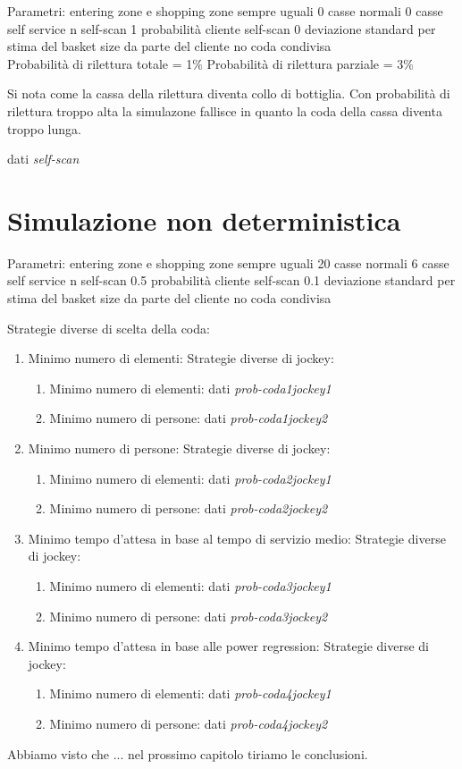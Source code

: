 Parametri:
entering zone e shopping zone sempre uguali
0 casse normali
0 casse self service
n self-scan
1 probabilità cliente self-scan
0 deviazione standard per stima del basket size da parte del cliente
no coda condivisa
\\
Probabilità di rilettura totale = 1\%
Probabilità di rilettura parziale = 3\%

Si nota come la cassa della rilettura diventa collo di bottiglia. Con probabilità di rilettura troppo alta la simulazone fallisce in quanto la coda della cassa diventa troppo lunga.

dati \textit{self-scan}

\section{Simulazione non deterministica}

Parametri:
entering zone e shopping zone sempre uguali
20 casse normali
6 casse self service
n self-scan
0.5 probabilità cliente self-scan
0.1 deviazione standard per stima del basket size da parte del cliente
no coda condivisa

Strategie diverse di scelta della coda:
\begin{enumerate}
	\item Minimo numero di elementi:
	Strategie diverse di jockey:
	\begin{enumerate}
		\item Minimo numero di elementi: dati \textit{prob-coda1jockey1}
		\item Minimo numero di persone: dati \textit{prob-coda1jockey2}
	\end{enumerate}
	\item Minimo numero di persone:
	Strategie diverse di jockey:
	\begin{enumerate}
		\item Minimo numero di elementi: dati \textit{prob-coda2jockey1}
		\item Minimo numero di persone: dati \textit{prob-coda2jockey2}
	\end{enumerate}
	\item Minimo tempo d'attesa in base al tempo di servizio medio:
	Strategie diverse di jockey:
	\begin{enumerate}
		\item Minimo numero di elementi: dati \textit{prob-coda3jockey1}
		\item Minimo numero di persone: dati \textit{prob-coda3jockey2}
	\end{enumerate}
	\item Minimo tempo d'attesa in base alle power regression: Strategie diverse di jockey:
	\begin{enumerate}
		\item Minimo numero di elementi: dati \textit{prob-coda4jockey1}
		\item Minimo numero di persone: dati \textit{prob-coda4jockey2}
	\end{enumerate}
\end{enumerate}

\vspace*{1\baselineskip}



Abbiamo visto che ... nel prossimo capitolo tiriamo le conclusioni.
